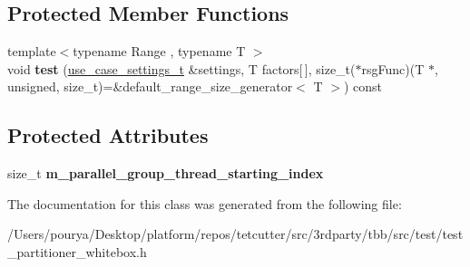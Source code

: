 \subsection*{Protected Member Functions}
\begin{DoxyCompactItemize}
\item 
\hypertarget{classuniform__iterations__distribution_1_1ParallelTestBody_abeb53bc73bf48142166476ae412d2ece}{}{\footnotesize template$<$typename Range , typename T $>$ }\\void {\bfseries test} (\hyperlink{structuniform__iterations__distribution_1_1ParallelTestBody_1_1use__case__settings__t}{use\+\_\+case\+\_\+settings\+\_\+t} \&settings, T factors\mbox{[}$\,$\mbox{]}, size\+\_\+t($\ast$rsg\+Func)(T $\ast$, unsigned, size\+\_\+t)=\&default\+\_\+range\+\_\+size\+\_\+generator$<$ T $>$) const \label{classuniform__iterations__distribution_1_1ParallelTestBody_abeb53bc73bf48142166476ae412d2ece}

\end{DoxyCompactItemize}
\subsection*{Protected Attributes}
\begin{DoxyCompactItemize}
\item 
\hypertarget{classuniform__iterations__distribution_1_1ParallelTestBody_a2a295fd7654cbca8fa622af248485856}{}size\+\_\+t {\bfseries m\+\_\+parallel\+\_\+group\+\_\+thread\+\_\+starting\+\_\+index}\label{classuniform__iterations__distribution_1_1ParallelTestBody_a2a295fd7654cbca8fa622af248485856}

\end{DoxyCompactItemize}


The documentation for this class was generated from the following file\+:\begin{DoxyCompactItemize}
\item 
/\+Users/pourya/\+Desktop/platform/repos/tetcutter/src/3rdparty/tbb/src/test/test\+\_\+partitioner\+\_\+whitebox.\+h\end{DoxyCompactItemize}
